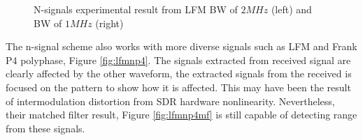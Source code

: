 \documentclass[letterpaper, 12 pt, conference]{report}
\numberwithin{figure}{section}
\begin{document}
\begin{figure}[h]
\noindent{}
\noindent{}
\noindent{}
\noindent{}
\caption{N-signals experimental result from LFM BW of $2 MHz$ (left) and BW of $1 MHz$ (right)}
\label{fig:lfmnlfm}
\end{figure}
\FloatBarrier
The n-signal scheme also works with more diverse signals such as LFM and Frank P4 polyphase, Figure \ref{fig:lfmnp4}. The signals extracted from received signal are clearly affected by the other waveform, the extracted signals from the received is focused on the pattern to show how it is affected. This may have been the result of intermodulation distortion from SDR hardware nonlinearity.   Nevertheless, their matched filter result, Figure \ref{fig:lfmnp4mf} is still capable of detecting range from these signals. 
\end{document}
